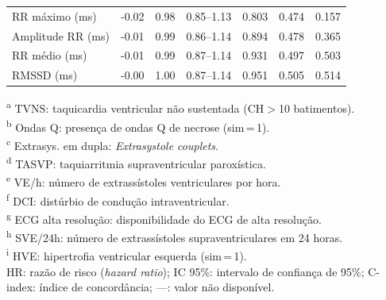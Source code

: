 \begin{table}[htbp]
{\begin{tabular}{lcccccc}
			RR m\'aximo (ms)
			 & -0.02 & 0.98 & 0.85--1.13 & 0.803     & 0.474   & 0.157          \\
			Amplitude RR (ms)
			 & -0.01 & 0.99 & 0.86--1.14 & 0.894     & 0.478   & 0.365          \\
			RR m\'edio (ms)
			 & -0.01 & 0.99 & 0.87--1.14 & 0.931     & 0.497   & 0.503          \\
			RMSSD (ms)
			 & -0.00 & 1.00 & 0.87--1.14 & 0.951     & 0.505   & 0.514          \\
			\bottomrule
		\end{tabular}%
	}
	\begin{flushleft}
		\footnotesize
		\textsuperscript{a} TVNS: taquicardia ventricular não sustentada (CH$>$10 batimentos).\\
		\textsuperscript{b} Ondas Q: presença de ondas Q de necrose (sim\,=\,1).\\
		\textsuperscript{c} Extrasys. em dupla: \textit{Extrasystole couplets}.\\
		\textsuperscript{d} TASVP: taquiarritmia supraventricular paroxística.\\
		\textsuperscript{e} VE/h: número de extrassístoles ventriculares por hora.\\
		\textsuperscript{f} DCI: distúrbio de condução intraventricular.\\
		\textsuperscript{g} ECG alta resolução: disponibilidade do ECG de alta resolução.\\
		\textsuperscript{h} SVE/24h: número de extrassístoles supraventriculares em 24 horas.\\
		\textsuperscript{i} HVE: hipertrofia ventricular esquerda (sim\,=\,1).\\
		HR: razão de risco (\textit{hazard ratio}); IC 95\%: intervalo de confiança de 95\%;
		C-index: índice de concordância; ---: valor não disponível.
	\end{flushleft}
\end{table}

\FloatBarrier


